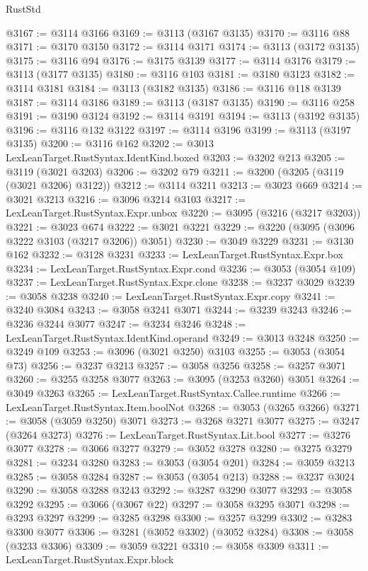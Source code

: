 \begin{lexlean}{RustStd}
\begin{coremodule}
@3167 := @3114 @3166
@3169 := @3113 (@3167 @3135)
@3170 := @3116 @88
@3171 := @3170 @3150
@3172 := @3114 @3171
@3174 := @3113 (@3172 @3135)
@3175 := @3116 @94
@3176 := @3175 @3139
@3177 := @3114 @3176
@3179 := @3113 (@3177 @3135)
@3180 := @3116 @103
@3181 := @3180 @3123
@3182 := @3114 @3181
@3184 := @3113 (@3182 @3135)
@3186 := @3116 @118 @3139
@3187 := @3114 @3186
@3189 := @3113 (@3187 @3135)
@3190 := @3116 @258
@3191 := @3190 @3124
@3192 := @3114 @3191
@3194 := @3113 (@3192 @3135)
@3196 := @3116 @132 @3122
@3197 := @3114 @3196
@3199 := @3113 (@3197 @3135)
@3200 := @3116 @162
@3202 := @3013 LexLeanTarget.RustSyntax.IdentKind.boxed
@3203 := @3202 @213
@3205 := @3119 (@3021 @3203)
@3206 := @3202 @79
@3211 := @3200 (@3205 (@3119 (@3021 @3206) @3122))
@3212 := @3114 @3211
@3213 := @3023 @669
@3214 := @3021 @3213
@3216 := @3096 @3214 @3103
@3217 := LexLeanTarget.RustSyntax.Expr.unbox
@3220 := @3095 (@3216 (@3217 @3203))
@3221 := @3023 @674
@3222 := @3021 @3221
@3229 := @3220 (@3095 (@3096 @3222 @3103 (@3217 @3206)) @3051)
@3230 := @3049 @3229
@3231 := @3130 @162
@3232 := @3128 @3231
@3233 := LexLeanTarget.RustSyntax.Expr.box
@3234 := LexLeanTarget.RustSyntax.Expr.cond
@3236 := @3053 (@3054 @109)
@3237 := LexLeanTarget.RustSyntax.Expr.clone
@3238 := @3237 @3029
@3239 := @3058 @3238
@3240 := LexLeanTarget.RustSyntax.Expr.copy
@3241 := @3240 @3084
@3243 := @3058 @3241 @3071
@3244 := @3239 @3243
@3246 := @3236 @3244 @3077
@3247 := @3234 @3246
@3248 := LexLeanTarget.RustSyntax.IdentKind.operand
@3249 := @3013 @3248
@3250 := @3249 @109
@3253 := @3096 (@3021 @3250) @3103
@3255 := @3053 (@3054 @73)
@3256 := @3237 @3213
@3257 := @3058 @3256
@3258 := @3257 @3071
@3260 := @3255 @3258 @3077
@3263 := @3095 (@3253 @3260) @3051
@3264 := @3049 @3263
@3265 := LexLeanTarget.RustSyntax.Callee.runtime
@3266 := LexLeanTarget.RustSyntax.Item.boolNot
@3268 := @3053 (@3265 @3266)
@3271 := @3058 (@3059 @3250) @3071
@3273 := @3268 @3271 @3077
@3275 := @3247 (@3264 @3273)
@3276 := LexLeanTarget.RustSyntax.Lit.bool
@3277 := @3276 @3077
@3278 := @3066 @3277
@3279 := @3052 @3278
@3280 := @3275 @3279
@3281 := @3234 @3280
@3283 := @3053 (@3054 @201)
@3284 := @3059 @3213
@3285 := @3058 @3284
@3287 := @3053 (@3054 @213)
@3288 := @3237 @3024
@3290 := @3058 @3288 @3243
@3292 := @3287 @3290 @3077
@3293 := @3058 @3292
@3295 := @3066 (@3067 @22)
@3297 := @3058 @3295 @3071
@3298 := @3293 @3297
@3299 := @3285 @3298
@3300 := @3257 @3299
@3302 := @3283 @3300 @3077
@3306 := @3281 (@3052 @3302) (@3052 @3284)
@3308 := @3058 (@3233 @3306)
@3309 := @3059 @3221
@3310 := @3058 @3309
@3311 := LexLeanTarget.RustSyntax.Expr.block

\end{coremodule}
\end{lexlean}

